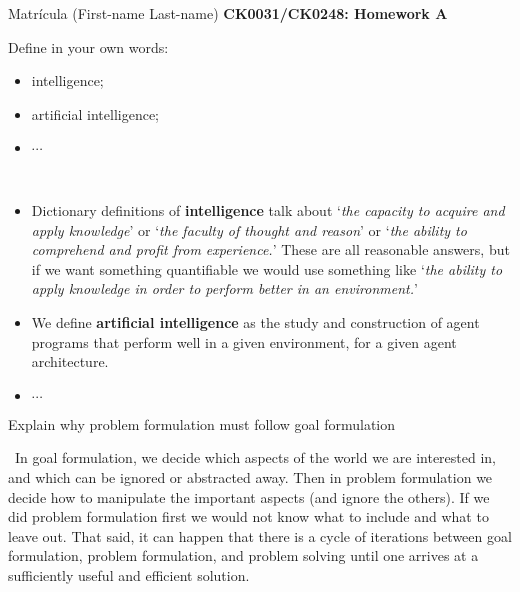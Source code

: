 \documentclass[11pt]{article}
\newenvironment{EX}[2][Exercise]{\begin{trivlist}
\item[{\color{red} \hskip \labelsep {\bfseries #1}\hskip \labelsep {\bfseries #2.}}]}{\end{trivlist}}
\newenvironment{SL}[1][Solution]{\begin{trivlist}
\item[{\color{blue} \hskip \labelsep {\bfseries #1:}}]}{\end{trivlist}}
\begin{document}

\noindent Matr\'icula (First-name Last-name) \hfill {\Large \bfseries CK0031/CK0248: Homework A} \\

\begin{EX}{A.1}
 Define in your own words:
 \begin{itemize}
  \item[a)] intelligence;
  \item[b)] artificial intelligence;
  \item[c)] $\cdots$
 \end{itemize}
\end{EX}

\begin{SL}\
 \begin{itemize}
  \item[a)] Dictionary definitions of \textbf{intelligence} talk about `\textit{the capacity to acquire and apply knowledge}' or `\textit{the faculty of thought and reason}' or `\textit{the ability to comprehend and profit from experience.}' These are all reasonable answers, but if we want something quantifiable we would use something like `\textit{the ability to apply knowledge in order to perform better in an environment.}' 
  \item[b)] We define \textbf{artificial intelligence} as the study and construction of agent programs that perform well in a given environment, for a given agent architecture.
  \item[c)] $\cdots$
 \end{itemize}
\end{SL}


\begin{EX}{A.2}
Explain why problem formulation must follow goal formulation
\end{EX}

\begin{SL}\
In goal formulation, we decide which aspects of the world we are interested in, and which can be ignored or abstracted away. Then in problem formulation we decide how to manipulate the important aspects (and ignore the others). If we did problem formulation first we would not know what to include and what to leave out. That said, it can happen that there is a cycle of iterations between goal formulation, problem formulation, and problem solving until one arrives at a sufficiently useful and efficient solution.
\end{SL}
\end{document}
